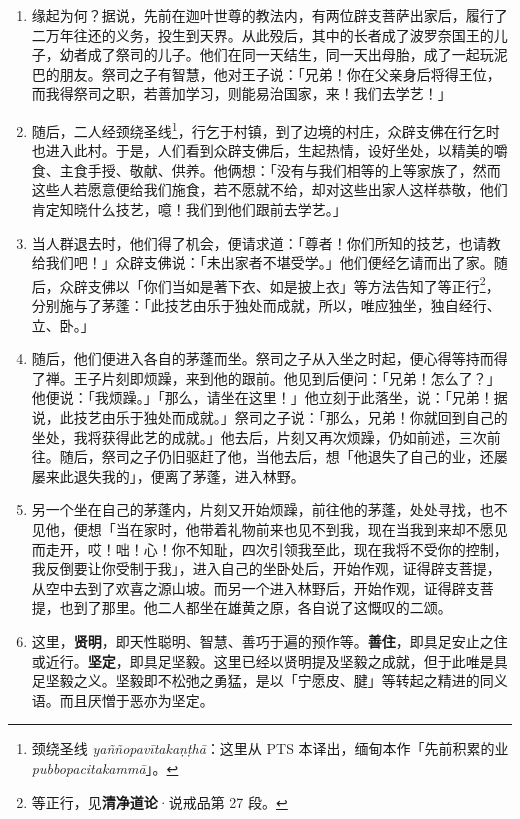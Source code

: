 \begin{enumerate}\item 缘起为何？据说，先前在迦叶世尊的教法内，有两位辟支菩萨出家后，履行了二万年往还的义务，投生到天界。从此殁后，其中的长者成了波罗奈国王的儿子，幼者成了祭司的儿子。他们在同一天结生，同一天出母胎，成了一起玩泥巴的朋友。祭司之子有智慧，他对王子说：「兄弟！你在父亲身后将得王位，而我得祭司之职，若善加学习，则能易治国家，来！我们去学艺！」
\item 随后，二人经颈绕圣线\footnote{颈绕圣线 \textit{yaññopavītakaṇṭhā}：这里从 PTS 本译出，缅甸本作「先前积累的业 \textit{pubbopacitakammā}」。}，行乞于村镇，到了边境的村庄，众辟支佛在行乞时也进入此村。于是，人们看到众辟支佛后，生起热情，设好坐处，以精美的嚼食、主食手授、敬献、供养。他俩想：「没有与我们相等的上等家族了，然而这些人若愿意便给我们施食，若不愿就不给，却对这些出家人这样恭敬，他们肯定知晓什么技艺，噫！我们到他们跟前去学艺。」
\item 当人群退去时，他们得了机会，便请求道：「尊者！你们所知的技艺，也请教给我们吧！」众辟支佛说：「未出家者不堪受学。」他们便经乞请而出了家。随后，众辟支佛以「你们当如是著下衣、如是披上衣」等方法告知了等正行\footnote{等正行，见\textbf{清净道论}·说戒品第 27 段。}，分别施与了茅蓬：「此技艺由乐于独处而成就，所以，唯应独坐，独自经行、立、卧。」
\item 随后，他们便进入各自的茅蓬而坐。祭司之子从入坐之时起，便心得等持而得了禅。王子片刻即烦躁，来到他的跟前。他见到后便问：「兄弟！怎么了？」他便说：「我烦躁。」「那么，请坐在这里！」他立刻于此落坐，说：「兄弟！据说，此技艺由乐于独处而成就。」祭司之子说：「那么，兄弟！你就回到自己的坐处，我将获得此艺的成就。」他去后，片刻又再次烦躁，仍如前述，三次前往。随后，祭司之子仍旧驱赶了他，当他去后，想「他退失了自己的业，还屡屡来此退失我的」，便离了茅蓬，进入林野。
\item 另一个坐在自己的茅蓬内，片刻又开始烦躁，前往他的茅蓬，处处寻找，也不见他，便想「当在家时，他带着礼物前来也见不到我，现在当我到来却不愿见而走开，哎！咄！心！你不知耻，四次引领我至此，现在我将不受你的控制，我反倒要让你受制于我」，进入自己的坐卧处后，开始作观，证得辟支菩提，从空中去到了欢喜之源山坡。而另一个进入林野后，开始作观，证得辟支菩提，也到了那里。他二人都坐在雄黄之原，各自说了这慨叹的二颂。
\item 这里，\textbf{贤明}，即天性聪明、智慧、善巧于遍的预作等。\textbf{善住}，即具足安止之住或近行。\textbf{坚定}，即具足坚毅。这里已经以贤明提及坚毅之成就，但于此唯是具足坚毅之义。坚毅即不松弛之勇猛，是以「宁愿皮、腱」等转起之精进的同义语。而且厌憎于恶亦为坚定。\end{enumerate}

